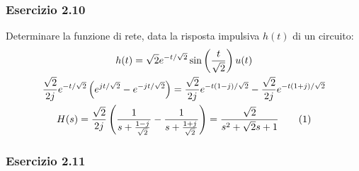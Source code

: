 \documentclass{article}
\newcommand{\tageq}{\tag{\stepcounter{equation}\theequation}}
\begin{document}
\subsubsection*{Esercizio 2.10}

Determinare la funzione di rete, data la risposta impulsiva $h(t)$ di un circuito:
\begin{gather*}
    h(t)=\sqrt{2}e^{-t/\sqrt{2}}\sin\left(\frac{t}{\sqrt{2}}\right)u(t)\\
    \displaystyle\frac{\sqrt{2}}{2j}e^{-t/\sqrt{2}}\left(e^{jt/\sqrt{2}}-e^{-jt/\sqrt{2}}\right)=\frac{\sqrt{2}}{2j}e^{-t(1-j)/\sqrt{2}}-\frac{\sqrt{2}}{{2j}}e^{-t(1+j)/\sqrt{2}}\\
    H(s)=\displaystyle\frac{\sqrt{2}}{2j}\left(\frac{1}{s+\frac{1-j}{\sqrt{2}}}-\frac{1}{s+\frac{1+j}{\sqrt{2}}}\right)=\frac{\sqrt{2}}{s^2+\sqrt{2}s+1}\tageq
\end{gather*}

\subsubsection*{Esercizio 2.11}
\end{document}
